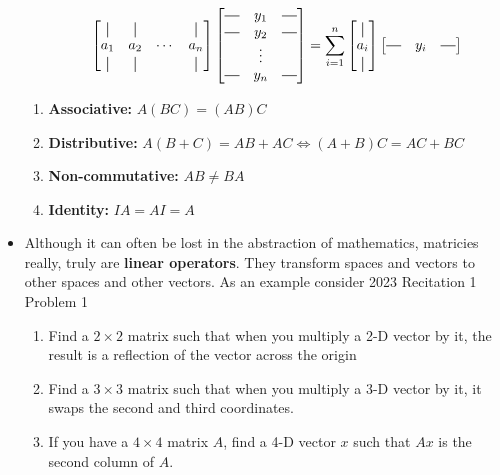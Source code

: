 \documentclass[11pt]{article}
\newcommand*{\vertbar}{\rule[-1ex]{0.5pt}{2.5ex}}
\newcommand*{\horzbar}{\rule[.5ex]{2.5ex}{0.5pt}}
\begin{document}
\begin{itemize}
\begin{enumerate}
$$\begin{bmatrix}
			  \vertbar & \vertbar &  & \vertbar\\
			a_{1} & a_{2} & \cdots & a_{n}\\
			\vertbar & \vertbar &  & \vertbar
			\end{bmatrix}
			\begin{bmatrix}
			  \horzbar & y_{1} & \horzbar\\
			\horzbar & y_{2} & \horzbar\\
			 & \vdots & \\
			\horzbar & y_{n} & \horzbar
			\end{bmatrix} = 
			\sum_{i=1}^{n} \begin{bmatrix}
			  \vertbar \\
			a_{i}\\
			\vertbar
			\end{bmatrix} \begin{bmatrix}
			  \horzbar & y_{i} & \horzbar
			\end{bmatrix}$$
	\end{enumerate}
	\begin{ideabox}\quad
		\begin{enumerate}
			\item \textbf{Associative: } $A(BC) = (AB)C$
			\item \textbf{Distributive: } $A(B+C) = AB + AC \iff (A+B)C = AC+BC$
			\item \textbf{Non-commutative: } $AB \neq BA$
			\item \textbf{Identity: } $IA = AI = A$
		\end{enumerate} 
	\end{ideabox}
\item Although it can often be lost in the abstraction of mathematics, matricies really, truly are \textbf{linear operators}. They transform spaces and vectors to other spaces and other vectors. As an example consider 2023 Recitation 1 Problem 1
	\begin{examplebox}[1.1]
		\begin{enumerate}
	\item Find a $2 \times 2$ matrix such that when you multiply a 2-D vector by it, the result is a reflection of the vector across the origin
	\item Find a $3 \times 3$ matrix such that when you multiply a 3-D vector by it, it swaps the second and third coordinates.
	\item If you have a $4 \times 4$ matrix $A$, find a 4-D vector $x$ such that $Ax$ is the second column of $A$.
		    

\end{enumerate}
\end{examplebox}
\end{itemize}
\end{document}
